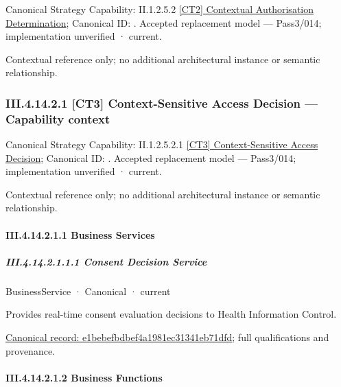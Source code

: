 {\small Canonical Strategy Capability: II.1.2.5.2 \hyperref[element:c8bd1d6e0796442a934a74cc69077543]{[CT2] Contextual Authorisation Determination}; Canonical ID: \texttt{}. Accepted replacement model — Pass3/014; implementation unverified · current.}\par
Contextual reference only; no additional architectural instance or semantic relationship.\par
\subsubsection*{III.4.14.2.1 [CT3] Context-Sensitive Access Decision — Capability context}
\label{navigation:III.4.14.2.1}

{\small Canonical Strategy Capability: II.1.2.5.2.1 \hyperref[element:8719d8ed49f940cfbba2d26ae14ea54d]{[CT3] Context-Sensitive Access Decision}; Canonical ID: \texttt{}. Accepted replacement model — Pass3/014; implementation unverified · current.}\par
Contextual reference only; no additional architectural instance or semantic relationship.\par
\paragraph*{III.4.14.2.1.1 Business Services}
\label{navigation:III.4.14.2.1.1}

\subparagraph*{III.4.14.2.1.1.1 Consent Decision Service}
\label{navigation:III.4.14.2.1.1.1}

\label{element:e1bebefbdbef4a1981ec31341eb71dfd}
{\small BusinessService · Canonical · current}\par

Provides real-time consent evaluation decisions to Health Information Control.


{\footnotesize \href{../../../../continuum/business/business-service/e1bebefbdbef4a1981ec31341eb71dfd.md}{Canonical record: e1bebefbdbef4a1981ec31341eb71dfd}; full qualifications and provenance.}\par
\paragraph*{III.4.14.2.1.2 Business Functions}
\label{navigation:III.4.14.2.1.2}

